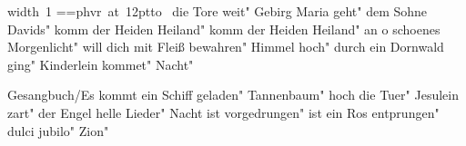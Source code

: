 \ifx\mxversion\undefined
  
  
  
  
\fi

%
\newbox\datebox%
\hbox{\pdfximage width 1\pdfrefximage\pdflastximage}
\setbox\datebox=\hbox{\font\datefont=phvr at 12pt\datefont{}\hbox to }%
\ht\datebox=0pt%
\box\datebox%
\vfill\eject
\tableofcontents
\normalmusicsize
 die Tore weit"
 Gebirg Maria geht"
 dem Sohne Davids"
 komm der Heiden Heiland"
 komm der Heiden Heiland"
 an o schoenes Morgenlicht"
 will dich mit Fleiß bewahren"
 Himmel hoch"
 durch ein Dornwald ging"
 Kinderlein kommet"
 Nacht"

 Gesangbuch/Es kommt ein Schiff geladen"
 Tannenbaum"
 hoch die Tuer"
 Jesulein zart"
\makeatletter
{}
\makeatother
 der Engel helle Lieder"
 Nacht ist vorgedrungen"
 ist ein Ros entprungen"
\makeatletter
{}
\makeatother
 dulci jubilo"
\makeatletter
{}
\makeatother
 Zion"
\bookbye